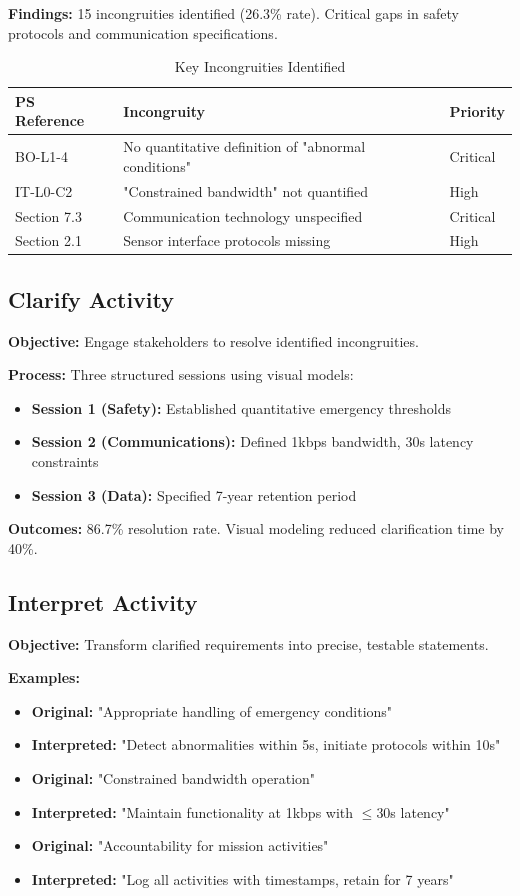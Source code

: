\documentclass[12pt,a4paper]{article}
\begin{document}
\textbf{Findings:} 15 incongruities identified (26.3\% rate). Critical gaps in safety protocols and communication specifications.

\begin{table}[H]
\centering
\small
\begin{tabular}{|p{}|p{}|p{}|}
\hline
\textbf{PS Reference} & \textbf{Incongruity} & \textbf{Priority} \\
\hline
BO-L1-4 & No quantitative definition of "abnormal conditions" & Critical \\
\hline
IT-L0-C2 & "Constrained bandwidth" not quantified & High \\
\hline
Section 7.3 & Communication technology unspecified & Critical \\
\hline
Section 2.1 & Sensor interface protocols missing & High \\
\hline
\end{tabular}
\caption{Key Incongruities Identified}
\end{table}

\subsection{Clarify Activity}
\textbf{Objective:} Engage stakeholders to resolve identified incongruities.

\textbf{Process:} Three structured sessions using visual models:
\begin{itemize}
\item \textbf{Session 1 (Safety):} Established quantitative emergency thresholds
\item \textbf{Session 2 (Communications):} Defined 1kbps bandwidth, 30s latency constraints
\item \textbf{Session 3 (Data):} Specified 7-year retention period
\end{itemize}

\textbf{Outcomes:} 86.7\% resolution rate. Visual modeling reduced clarification time by 40\%.

\subsection{Interpret Activity}
\textbf{Objective:} Transform clarified requirements into precise, testable statements.

\textbf{Examples:}
\begin{itemize}
\item \textbf{Original:} "Appropriate handling of emergency conditions"
\item \textbf{Interpreted:} "Detect abnormalities within 5s, initiate protocols within 10s"
\item \textbf{Original:} "Constrained bandwidth operation"
\item \textbf{Interpreted:} "Maintain functionality at 1kbps with $\leq$30s latency"
\item \textbf{Original:} "Accountability for mission activities"
\item \textbf{Interpreted:} "Log all activities with timestamps, retain for 7 years"
\end{itemize}
\end{document}

